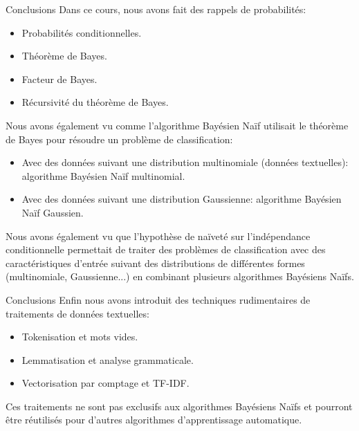 \documentclass[10pt]{beamer}  %
\begin{document}
\begin{frame}{Conclusions}
	Dans ce cours, nous avons fait des rappels de probabilités:
	\begin{itemize}
		\item Probabilités conditionnelles.
		\item Théorème de Bayes.
		\item Facteur de Bayes.
		\item Récursivité du théorème de Bayes.
	\end{itemize}
	\pause
	Nous avons également vu comme l'algorithme Bayésien Naïf utilisait le théorème de Bayes pour résoudre un problème de classification:
	\begin{itemize}
		\item Avec des données suivant une distribution multinomiale (données textuelles): algorithme Bayésien Naïf multinomial.
		\item Avec des données suivant une distribution Gaussienne: algorithme Bayésien Naïf Gaussien.
	\end{itemize}
	\pause
	Nous avons également vu que l'hypothèse de naïveté sur l'indépendance conditionnelle permettait de traiter des problèmes de classification avec des caractéristiques d'entrée suivant des distributions de différentes formes (multinomiale, Gaussienne...) en combinant plusieurs algorithmes Bayésiens Naïfs.
\end{frame}

\begin{frame}{Conclusions}
	Enfin nous avons introduit des techniques rudimentaires de traitements de données textuelles:
	\begin{itemize}
		\item Tokenisation et mots vides.
		\item Lemmatisation et analyse grammaticale.
		\item Vectorisation par comptage et TF-IDF.
	\end{itemize}
	\pause
	Ces traitements ne sont pas exclusifs aux algorithmes Bayésiens Naïfs et pourront être réutilisés pour d'autres algorithmes d'apprentissage automatique.
\end{frame}


\end{document}
